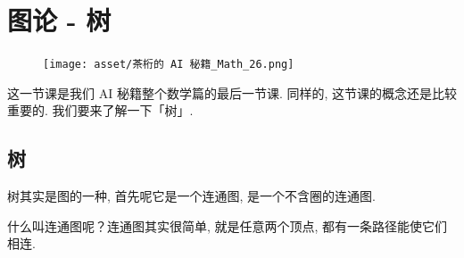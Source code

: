 \chapter{图论 - 树}

\begin{figure}[ht]
  \centering
  \texttt{[image: asset/茶桁的 AI 秘籍\_Math\_26.png]}
\end{figure}

\newpage

这一节课是我们 AI 秘籍整个数学篇的最后一节课. 同样的, 这节课的概念还是比较重要的. 我们要来了解一下「树」. 

\section{树}

树其实是图的一种, 首先呢它是一个连通图, 是一个不含圈的连通图. 

什么叫连通图呢？连通图其实很简单, 就是任意两个顶点, 都有一条路径能使它们相连. 

